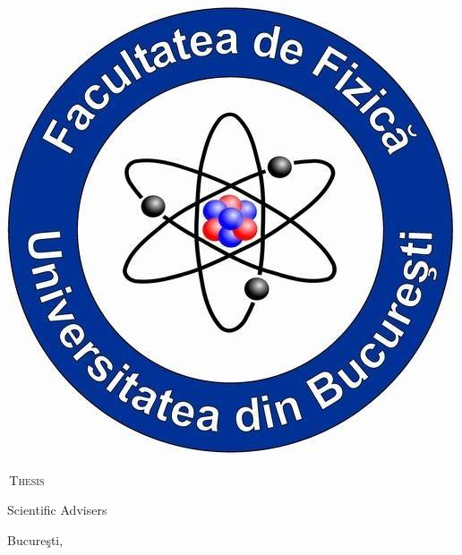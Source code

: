 \begin{titlepage}
\begin{minipage}[c]{0.15\textwidth}
		\includegraphics[height=0.1\textheight]{images/logo_faculty.jpg}
	\end{minipage}

	\bigvspace
	
		{\Large\sffamily \studentname}
		
	\smallvspace
	
	\topdoublerule 
	\begin{spacing}{2.5}
		{\huge\scshape\sffamily \thesistitle}
		\ifthenelse{\equal{\thesissubtitle}{}}{
		}{
		\\ 
		{\large \thesissubtitle}
		}		
	\end{spacing}
	\bottomdoublerule
	
	\smallvspace
	
		{\large\scshape \thesistype\,Thesis}	
		
	\mediumvspace

	\begin{minipage}{\textwidth}
		\begin{flushright} \large
			{Scientific Advisers} \\[5pt]
			\firstsupervisorprefix\hspace{5pt}{\sffamily \firstsupervisor}\ifthenelse{\equal{\secondsupervisor}{}}{\rowskip}{\\\secondsupervisorprefix\hspace{5pt}{\sffamily \secondsupervisor}}			
		\end{flushright}
	\end{minipage}

	\ifthenelse{\equal{\thesissubtitle}{}}{\bigvspace}{\itermediatevspace}

	{\large Bucureşti, \the\year}
	
	

\end{titlepage}

